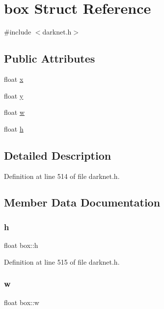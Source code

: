 \hypertarget{structbox}{}\section{box Struct Reference}
\label{structbox}


{\ttfamily \#include $<$darknet.\+h$>$}

\subsection*{Public Attributes}
\begin{DoxyCompactItemize}
\item 
float \mbox{\hyperlink{structbox_a26adb5cfaf492245aba926b2f212b712}{x}}
\item 
float \mbox{\hyperlink{structbox_ab25e5389fd474ccd83c7dfcf0b1f9957}{y}}
\item 
float \mbox{\hyperlink{structbox_abd9b0191e52f22befa76bcf37b9e6477}{w}}
\item 
float \mbox{\hyperlink{structbox_a56959fa604cfb411d0c001be7c444d05}{h}}
\end{DoxyCompactItemize}


\subsection{Detailed Description}


Definition at line 514 of file darknet.\+h.



\subsection{Member Data Documentation}
\mbox{\label{structbox_a56959fa604cfb411d0c001be7c444d05}} 
\subsubsection{\texorpdfstring{h}{h}}
{\footnotesize\ttfamily float box\+::h}



Definition at line 515 of file darknet.\+h.

\mbox{\label{structbox_abd9b0191e52f22befa76bcf37b9e6477}} 
\subsubsection{\texorpdfstring{w}{w}}
{\footnotesize\ttfamily float box\+::w}



